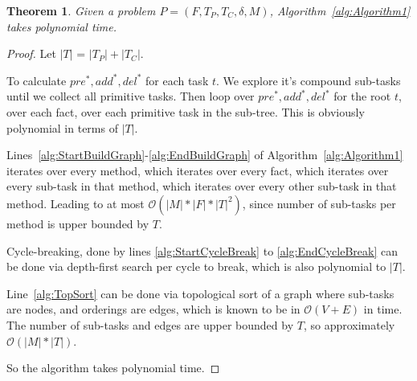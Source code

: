 \documentclass[letterpaper]{article} %
\newtheorem{theorem}{Theorem}
\newcommand{\PreS} {\ensuremath{\mathit{pre^{*}}}}
\newcommand{\AddS} {\ensuremath{\mathit{add^{*}}}}
\newcommand{\DelS} {\ensuremath{\mathit{del^{*}}}}
\begin{document}
\begin{theorem}\label{thm:Runtime}
	Given a problem $P = (F, T_P, T_C, \delta, M)$, Algorithm~\ref{alg:Algorithm1} takes polynomial time.
\end{theorem}
\begin{proof}  %
	Let $|T|$ = $|T_P| + |T_C|$.
	
	
	
	To calculate $\PreS, \AddS, \DelS$ for each task $t$. We explore it's compound sub-tasks until we collect all primitive tasks. Then loop over $\PreS, \AddS, \DelS$ for the root $t$, over each fact, over each primitive task in the sub-tree. This is obviously polynomial in terms of $|T|$. %
	
	Lines~\ref{alg:StartBuildGraph}-\ref{alg:EndBuildGraph} of Algorithm~\ref{alg:Algorithm1} iterates over every method, which iterates over every fact, which iterates over every sub-task in that method, which iterates over every other sub-task in that method. Leading to at most $\mathcal{O}(|M| * |F| * |T|^2)$, since number of sub-tasks per method is upper bounded by $T$.
	
	Cycle-breaking, done by lines \ref{alg:StartCycleBreak} to \ref{alg:EndCycleBreak} can be done via depth-first search per cycle to break, which is also polynomial to $|T|$.
	
	Line~\ref{alg:TopSort} can be done via topological sort of a graph where sub-tasks are nodes, and orderings are edges, which is known to be in $\mathcal{O}(V+E)$ in time. %
	The number of sub-tasks and edges are upper bounded by $T$, so approximately $\mathcal{O}(|M| * |T|)$.
	
	So the algorithm takes polynomial time. 
\end{proof}
\end{document}

